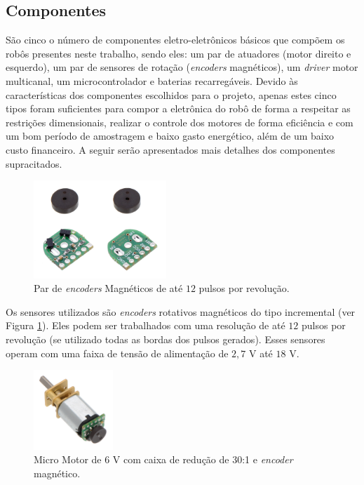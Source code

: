 \subsection{Componentes}
\label{subsec:componentes}

São cinco o número de componentes eletro-eletrônicos básicos que compõem os robôs presentes neste trabalho, sendo eles: um par de atuadores (motor direito e esquerdo), um par de sensores de rotação (\textit{encoders} magnéticos), um \emph{driver} motor multicanal, um microcontrolador e baterias recarregáveis. Devido às características dos componentes escolhidos para o projeto, apenas estes cinco tipos foram suficientes para compor a eletrônica do robô de forma a respeitar as restrições dimensionais, realizar o controle dos motores de forma eficiência e com um bom período de amostragem e baixo gasto energético, além de um baixo custo financeiro. A seguir serão apresentados mais detalhes dos componentes supracitados.\\

\begin{figure}[H]
    \centering
    \includegraphics[width=5cm]{figuras/eletronica/encoder_frente_verso.jpg}
    \caption{Par de \emph{encoders} Magnéticos de até $12$ pulsos por revolução.}
    \label{fig:encoder}
\end{figure}

Os sensores utilizados são \emph{encoders} rotativos magnéticos do tipo incremental (ver Figura \ref{fig:encoder}). Eles podem ser trabalhados com uma resolução de até $12$ pulsos por revolução (se utilizado todas as bordas dos pulsos gerados). Esses sensores operam com uma faixa de tensão de alimentação de $2,7$ V até $18$ V.\\

\begin{figure}[H]
    \centering
    \includegraphics[width=3cm]{figuras/eletronica/motor_com_encoder.jpg}
    \caption{Micro Motor de 6 V com caixa de redução de 30:1 e \textit{encoder} magnético.}
    \label{fig:motor_com_encoder}
\end{figure}

